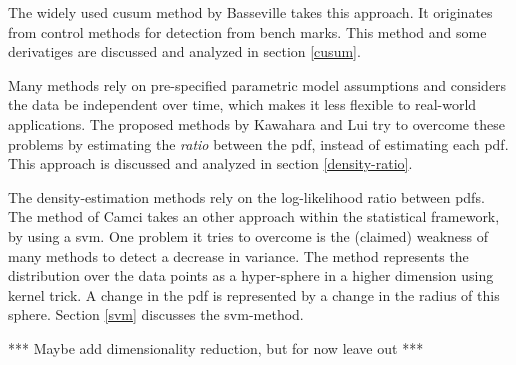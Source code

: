 The widely used \gls{cusum} method by Basseville \etal \cite{basseville1993detection} takes this approach.
It originates from control methods for detection from bench marks.
This method and some derivatiges are discussed and analyzed in section \ref{cusum}.

Many methods rely on pre-specified parametric model assumptions and considers the data be independent over time, which makes it less flexible to real-world applications.
The proposed methods by Kawahara \etal \cite{kawahara2009change} and Lui \etal \cite{liu2013change} try to overcome these problems by estimating the \emph{ratio} between the \gls{pdf}, instead of estimating each \gls{pdf}.
This approach is discussed and analyzed in section \ref{density-ratio}.

The density-estimation methods rely on the log-likelihood ratio between \glspl{pdf}.
The method of Camci \cite{camci2010change} takes an other approach within the statistical framework, by using a \gls{svm}.
One problem it tries to overcome is the (claimed) weakness of many methods to detect a decrease in variance.
The method represents the distribution over the data points as a hyper-sphere in a higher dimension using kernel trick.
A change in the \gls{pdf} is represented by a change in the radius of this sphere.
Section \ref{svm} discusses the \gls{svm}-method.


*** Maybe add dimensionality reduction, but for now leave out ***









% 
